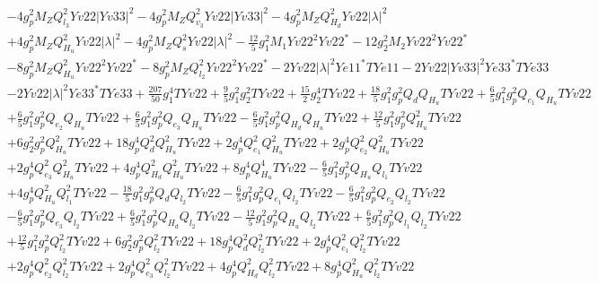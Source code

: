 \begin{align}
 &-4 g_{p}^{2} M_Z Q_{l_3}^{2} Yv22 |Yv33|^2 -4 g_{p}^{2} M_Z Q_{v_3}^{2} Yv22 |Yv33|^2 -4 g_{p}^{2} M_Z Q_{H_d}^{2} Yv22 |\lambda|^2 \nonumber \\ 
 &+4 g_{p}^{2} M_Z Q_{H_u}^{2} Yv22 |\lambda|^2 -4 g_{p}^{2} M_Z Q_{s}^{2} Yv22 |\lambda|^2 -\frac{12}{5} g_{1}^{2} M_1 Yv22^{2} Yv22^* -12 g_{2}^{2} M_2 Yv22^{2} Yv22^* \nonumber \\ 
 &-8 g_{p}^{2} M_Z Q_{H_u}^{2} Yv22^{2} Yv22^* -8 g_{p}^{2} M_Z Q_{l_2}^{2} Yv22^{2} Yv22^* -2 Yv22 |\lambda|^2 Ye11^* TYe11 -2 Yv22 |Yv33|^2 Ye33^* TYe33 \nonumber \\ 
 &-2 Yv22 |\lambda|^2 Ye33^* TYe33 +\frac{207}{50} g_{1}^{4} TYv22 +\frac{9}{5} g_{1}^{2} g_{2}^{2} TYv22 +\frac{15}{2} g_{2}^{4} TYv22 +\frac{18}{5} g_{1}^{2} g_{p}^{2} Q_{d} Q_{H_u} TYv22 +\frac{6}{5} g_{1}^{2} g_{p}^{2} Q_{e_{1}} Q_{H_u} TYv22 \nonumber \\ 
 &+\frac{6}{5} g_{1}^{2} g_{p}^{2} Q_{e_{2}} Q_{H_u} TYv22 +\frac{6}{5} g_{1}^{2} g_{p}^{2} Q_{e_3} Q_{H_u} TYv22 -\frac{6}{5} g_{1}^{2} g_{p}^{2} Q_{H_d} Q_{H_u} TYv22 +\frac{12}{5} g_{1}^{2} g_{p}^{2} Q_{H_u}^{2} TYv22 \nonumber \\ 
 &+6 g_{2}^{2} g_{p}^{2} Q_{H_u}^{2} TYv22 +18 g_{p}^{4} Q_{d}^{2} Q_{H_u}^{2} TYv22 +2 g_{p}^{4} Q_{e_{1}}^{2} Q_{H_u}^{2} TYv22 +2 g_{p}^{4} Q_{e_{2}}^{2} Q_{H_u}^{2} TYv22 \nonumber \\ 
 &+2 g_{p}^{4} Q_{e_3}^{2} Q_{H_u}^{2} TYv22 +4 g_{p}^{4} Q_{H_d}^{2} Q_{H_u}^{2} TYv22 +8 g_{p}^{4} Q_{H_u}^{4} TYv22 -\frac{6}{5} g_{1}^{2} g_{p}^{2} Q_{H_u} Q_{l_1} TYv22 \nonumber \\ 
 &+4 g_{p}^{4} Q_{H_u}^{2} Q_{l_1}^{2} TYv22 -\frac{18}{5} g_{1}^{2} g_{p}^{2} Q_{d} Q_{l_2} TYv22 -\frac{6}{5} g_{1}^{2} g_{p}^{2} Q_{e_{1}} Q_{l_2} TYv22 -\frac{6}{5} g_{1}^{2} g_{p}^{2} Q_{e_{2}} Q_{l_2} TYv22 \nonumber \\ 
 &-\frac{6}{5} g_{1}^{2} g_{p}^{2} Q_{e_3} Q_{l_2} TYv22 +\frac{6}{5} g_{1}^{2} g_{p}^{2} Q_{H_d} Q_{l_2} TYv22 -\frac{12}{5} g_{1}^{2} g_{p}^{2} Q_{H_u} Q_{l_2} TYv22 +\frac{6}{5} g_{1}^{2} g_{p}^{2} Q_{l_1} Q_{l_2} TYv22 \nonumber \\ 
 &+\frac{12}{5} g_{1}^{2} g_{p}^{2} Q_{l_2}^{2} TYv22 +6 g_{2}^{2} g_{p}^{2} Q_{l_2}^{2} TYv22 +18 g_{p}^{4} Q_{d}^{2} Q_{l_2}^{2} TYv22 +2 g_{p}^{4} Q_{e_{1}}^{2} Q_{l_2}^{2} TYv22 \nonumber \\ 
 &+2 g_{p}^{4} Q_{e_{2}}^{2} Q_{l_2}^{2} TYv22 +2 g_{p}^{4} Q_{e_3}^{2} Q_{l_2}^{2} TYv22 +4 g_{p}^{4} Q_{H_d}^{2} Q_{l_2}^{2} TYv22 +8 g_{p}^{4} Q_{H_u}^{2} Q_{l_2}^{2} TYv22 \nonumber \\ 

\end{align}
